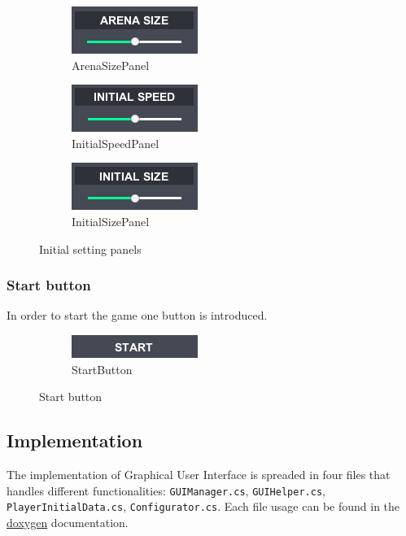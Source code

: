 \begin{figure}[!h]\label{gui-colors}\centering
	\captionsetup{justification=centering}
	\begin{subfigure}{0.25\textwidth}
		\includegraphics{gui-imgs/arenasizepanel}
		\caption*{ArenaSizePanel}
	\end{subfigure}
	\begin{subfigure}{0.25\textwidth}
		\includegraphics{gui-imgs/initialspeedpanel}
		\caption*{InitialSpeedPanel}
	\end{subfigure}
	\begin{subfigure}{0.25\textwidth}
		\includegraphics{gui-imgs/initialsizepanel}
		\caption*{InitialSizePanel}
	\end{subfigure}
	\caption{Initial setting panels}
\end{figure}

\subsubsection{Start button}\label{gui-startbutton}
\noindent In order to start the game one button is introduced.

\begin{figure}[!h]\label{gui-colors}\centering
	\begin{subfigure}{0.25\textwidth}
		\includegraphics{gui-imgs/startbutton}
		\caption*{StartButton}
	\end{subfigure}
	\caption{Start button}
\end{figure}

\subsection{Implementation}
\noindent The implementation of Graphical User Interface is spreaded in four files that handles different functionalities: \verb|GUIManager.cs|, \verb|GUIHelper.cs|, \verb|PlayerInitialData.cs|, \verb|Configurator.cs|. Each file usage can be found in the \href{run:../code_documentation.pdf}{doxygen} documentation.\\

